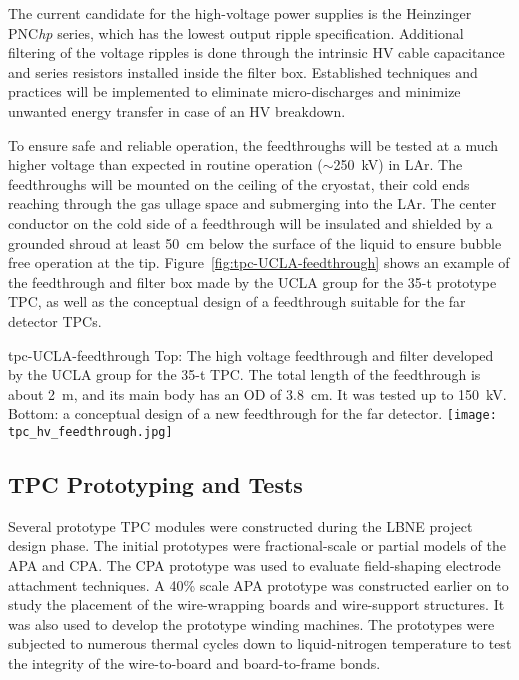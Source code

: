 The current candidate for the high-voltage power supplies is the
Heinzinger PNC\textit{hp} series, which has the lowest output ripple
specification.  Additional filtering of the voltage ripples is done
through the intrinsic HV cable capacitance and series resistors
installed inside the filter box. Established techniques and practices
will be implemented to eliminate micro-discharges and minimize
unwanted energy transfer in case of an HV breakdown.
  
To ensure safe and reliable operation, the feedthroughs will be tested
at a much higher voltage than expected in routine operation
($\sim$250~kV) in LAr. The feedthroughs will be mounted on
the ceiling of the cryostat, their cold ends reaching through the gas
ullage space and submerging into the LAr. The center
conductor on the cold side of a feedthrough will be insulated and
shielded by a grounded shroud at least 50~cm below the surface of the
liquid to ensure bubble free operation at the
tip. Figure~\ref{fig:tpc-UCLA-feedthrough} shows an example of the
feedthrough and filter box made by the UCLA group for the 35-t prototype TPC,
as well as the conceptual design of a feedthrough suitable for the far
detector TPCs.
\begin{cdrfigure}{tpc-UCLA-feedthrough}
{Top: The high voltage feedthrough and filter developed by the UCLA 
group for the 35-t TPC. The total length of the feedthrough is about 2~m, and its main body has an OD of 3.8~cm.  It was tested up to 150~kV.  
Bottom: a conceptual design of a new feedthrough for the far detector.}
\texttt{[image: tpc\_hv\_feedthrough.jpg]}
\end{cdrfigure}


\subsection{TPC Prototyping and Tests}
\label{subsec:fd-ref-tpc-proto}


Several prototype TPC modules were constructed during the LBNE project
design phase.  The initial prototypes were fractional-scale or partial
models of the APA and CPA. The CPA prototype was used to evaluate
field-shaping electrode attachment techniques. A 40\% scale APA
prototype was constructed earlier on to study the placement of the
wire-wrapping boards and wire-support structures. It was also used to
develop the prototype winding machines. The prototypes were subjected
to numerous thermal cycles down to liquid-nitrogen temperature to test
the integrity of the wire-to-board and board-to-frame bonds.

